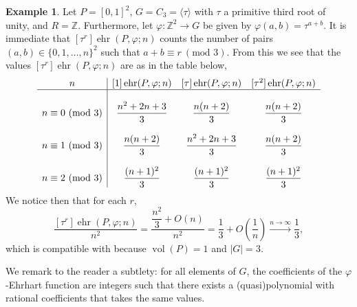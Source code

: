 \documentclass[12pt,reqno]{amsart}
\theoremstyle{definition}
\newtheorem{exam}[thm]{Example}
\theoremstyle{remark}
\DeclareMathOperator{\vol}{vol}
\renewcommand{\phi}{\varphi}
\DeclareMathOperator{\ehr}{ehr}
\begin{document}
\begin{exam}\label{ex:quasi}
Let $P=[0,1]^2$, $G=C_3=\langle \tau \rangle$ with $\tau$ a primitive third root of unity, and $R=\mathbb{Z}$. Furthermore, let $\phi:\mathbb{Z}^2 \to G$ be given by $\phi(a,b)=\tau^{a+b}$. It is immediate that $[\tau^r]\ehr(P,\varphi;n)$ counts the number of pairs $(a,b) \in \{0,1,\ldots,n\}^2$ such that $a+b \equiv r \ (\text{mod } 3)$. From this we see that the values $[\tau^r]\ehr(P,\varphi;n)$ are as in the table below,
\[
\begin{array}{c|ccc}
n & [1]\ehr(P,\phi;n) & [\tau]\ehr(P,\phi;n) & [\tau^2]\ehr(P,\phi;n) \\ \hline
& & \\
n \equiv 0 \text{ (mod } 3) & \dfrac{n^2+2n+3}{3} & \dfrac{n(n+2)}{3} & \dfrac{n(n+2)}{3} \\
& & \\
n \equiv 1 \text{ (mod } 3) & \dfrac{n(n+2)}{3} & \dfrac{n^2+2n+3}{3} & \dfrac{n(n+2)}{3} \\
& & \\
n \equiv 2 \text{ (mod } 3) & \dfrac{(n+1)^2}{3} & \dfrac{(n+1)^2}{3} & \dfrac{(n+1)^2}{3}
\end{array}
\]
We notice then that for each $r$,
\[
\frac{[\tau^r]\ehr(P,\varphi;n)}{n^2} = \frac{\dfrac{n^2}{3}+O(n)}{n^2} = \frac{1}{3} + O\left(\dfrac{1}{n}\right) \xrightarrow{n \to \infty} \frac{1}{3}, 
\]
which is compatible with  because $\vol(P)=1$ and $|G|=3$.

We remark to the reader a subtlety: for all elements of $G$, the coefficients of the $\phi$-Ehrhart function are integers such that there exists a (quasi)polynomial with rational coefficients that takes the same values.
\end{exam}
\end{document}
